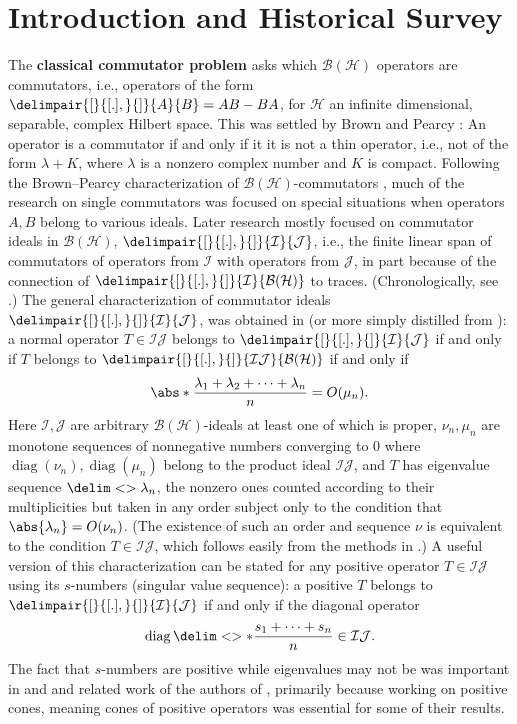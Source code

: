 \documentclass[10pt,reqno]{amsart}
\theoremstyle{remark}
\newcommand{\BH}{\mathcal{B}(\Hil)}
\newcommand{\Hil}{\mathcal{H}}
\DeclareMathOperator{\diag}{diag}
\newcommand{\seq}{\delim<>}
\newcommand{\comm}{\delimpair{[}{[.],}{]}}
\newcommand{\I}{\mathcal{I}}
\newcommand{\J}{\mathcal{J}}
\numberwithin{equation}{section}
\begin{document}
\section{Introduction and Historical Survey}
The  \textbf{classical commutator problem} asks which $\BH$ operators are commutators, i.e., operators of the form
$\comm{A}{B}=AB-BA$, for $\Hil$ an infinite dimensional, separable, complex Hilbert space.
This was settled by Brown and Pearcy \cite{BP-1965-AoM2}: An operator is a commutator if and only if it it is not a thin operator, i.e.,
not of the form $\lambda+K$, where $\lambda$ is a nonzero complex number and $K$ is compact.
Following the Brown--Pearcy characterization of $\BH$-commutators \cite{BP-1965-AoM2}, much of the research on single commutators was focused on special situations when operators $A,B$ belong to various ideals.
Later research mostly focused on commutator ideals in $\BH$, $\comm{\I}{\J}$, i.e., the finite  linear span of commutators of operators from $\I$ with operators from $\J$, in part because of the connection of $\comm{\I}{\BH}$ to traces.
(Chronologically, see \cite{PT-1971-MMJ,Wei-1975,And-1977-JRAM,Wei-1980-IEOT,Kal-1989-JFA,DFWW-2004-AM,KW-2010-JOT,DK-2018-PAMS}.)
The general characterization of commutator ideals $\comm{\I}{\J}$,  was obtained in \cite[Theorem 5.6]{DFWW-2004-AM} (or more simply distilled from \cite[Introduction pp. 2--3 and remark following]{DFWW-2004-AM}): a normal operator $T\in \I\J$
belongs to $\comm{\I}{\J}$ if and only if $T$ belongs to $\comm{\I\J}{\BH}$ if and only if
\begin{equation*}
  \abs*{\dfrac{\lambda_1+\lambda_2+\dots+\lambda_n}{n}} = O(\mu_n).
\end{equation*}
Here  $\I,\J$ are arbitrary $\BH$-ideals at least one of which is proper,
$\nu_n, \mu_n$ are monotone sequences of nonnegative numbers converging to 0 where $\diag(\nu_n), \diag(\mu_n)$ belong to the product ideal  $\I\J$,
and
$T$ has eigenvalue sequence $\seq{\lambda_n}$, the nonzero ones counted according to their multiplicities but taken in any order subject only to the condition that $\abs{\lambda_n}=O(\nu_n)$.
(The existence of such an order and sequence $\nu$ is equivalent to the condition $T \in \I\J$, which follows easily from the methods in \cite{DFWW-2004-AM}.)
A useful version of this characterization  can be stated for
any positive operator $T\in \I\J$ using its $s$-numbers (singular value sequence): a positive $T$ belongs to $\comm{\I}{\J}$ if and only if the diagonal operator
\begin{equation*}
  \diag \seq*{\dfrac{s_1+\dots+s_n}{n}} \in \I\J.
\end{equation*}
The fact that $s$-numbers are positive while eigenvalues may not be was important in \cite{DFWW-2004-AM} and \cite{KW-2010-JOT} and related work of the authors of \cite{KW-2010-JOT}, primarily because working on positive cones, meaning cones of positive operators was essential for some of their
results.
\end{document}
